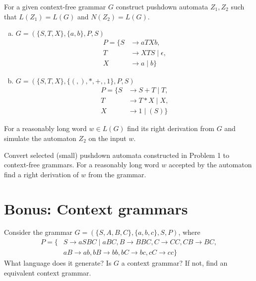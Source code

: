 \documentclass[a4paper,12pt]{amsart}
\begin{document}
\medskip\begin{problem}

    For a given context-free grammar $G$ construct pushdown automata $Z_1,Z_2$ such that $L(Z_1)=L(G)$ and $N(Z_2)=L(G)$.

    \bigskip

    \begin{enumerate}[(a)]\setlength\itemsep{12pt}
        \item $G=(\{S,T,X\},\{a,b\},P,S)$
            \begin{align*}
        P=\{S&\rightarrow aTXb, \\
        T&\rightarrow XTS\mid \epsilon,\\ 
        X&\rightarrow a\mid b\}
        \end{align*}
        \item $G=(\{S,T,X\},\{(,),*,+,,1\},P,S)$
            \begin{align*}
        P=\{S&\rightarrow S+T\mid T, \\
        T&\rightarrow T*X\mid X,\\ 
        X&\rightarrow 1\mid (S)\}
        \end{align*}
    \end{enumerate}

    For a reasonably long word $w\in L(G)$ find its right derivation from $G$ and simulate the automaton  $Z_2$ on the input $w$.

\end{problem}
    

\medskip\begin{problem}

    Convert selected (small) pushdown automata constructed in Problem 1 to context-free grammars. For a reasonably long word $w$ accepted by the automaton find a right derivation of $w$ from the grammar.

\end{problem}


\section*{Bonus: Context grammars}


\medskip\begin{problem}
    
    Consider the grammar $G=(\{S,A,B,C\},\{a,b,c\},S,P)$, where
    \begin{align*}
        P=\{&S\rightarrow aSBC\mid aBC, B\rightarrow BBC,  C\rightarrow CC, CB\rightarrow BC,\\ 
        &aB\rightarrow ab, bB\rightarrow bb, bC\rightarrow bc, cC\rightarrow cc\}
    \end{align*}
    What language does it generate? Is $G$ a context grammar? If not, find an equivalent context grammar.
    
\end{problem}
\end{document}
